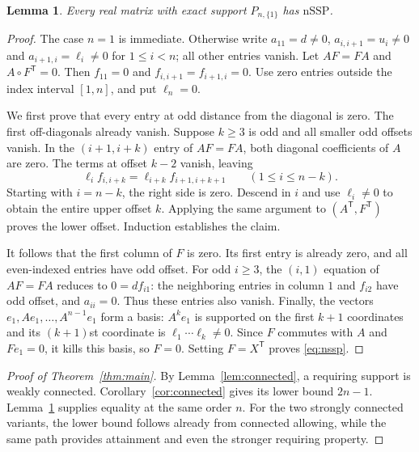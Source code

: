 \documentclass[11pt]{article}
\newtheorem{lemma}[theorem]{Lemma}
\newcommand{\nssp}{\mathrm{nSSP}}
\begin{document}
\begin{lemma}\label{lem:path}
Every real matrix with exact support $P_{n,\{1\}}$ has $\nssp$.
\end{lemma}
\begin{proof}
The case $n=1$ is immediate. Otherwise write
$a_{11}=d\ne0$, $a_{i,i+1}=u_i\ne0$ and
$a_{i+1,i}=\ell_i\ne0$ for $1\leq i<n$; all other entries vanish.
Let $AF=FA$ and $A\circ F^{\mathsf T}=0$. Then
$f_{11}=0$ and $f_{i,i+1}=f_{i+1,i}=0$.
Use zero entries outside the index interval $[1,n]$, and put
$\ell_n=0$.

We first prove that every entry at odd distance from the diagonal is
zero. The first off-diagonals already vanish. Suppose $k\geq3$ is odd
and all smaller odd offsets vanish. In the $(i+1,i+k)$ entry of
$AF=FA$, both diagonal coefficients of $A$ are zero. The terms at
offset $k-2$ vanish, leaving
\begin{equation}\label{eq:odd}
 \ell_i f_{i,i+k}=\ell_{i+k}f_{i+1,i+k+1}
 \qquad(1\leq i\leq n-k).
\end{equation}
Starting with $i=n-k$, the right side is zero. Descend in $i$ and
use $\ell_i\ne0$ to obtain the entire upper offset $k$. Applying the
same argument to $(A^{\mathsf T},F^{\mathsf T})$ proves the lower
offset. Induction establishes the claim.

It follows that the first column of $F$ is zero. Its first entry is
already zero, and all even-indexed entries have odd offset. For odd
$i\geq3$, the $(i,1)$ equation of $AF=FA$ reduces to
$0=d f_{i1}$: the neighboring entries in column $1$ and $f_{i2}$
have odd offset, and $a_{ii}=0$. Thus these entries also vanish.
Finally, the vectors $e_1,Ae_1,\ldots,A^{n-1}e_1$ form a basis:
$A^ke_1$ is supported on the first $k+1$ coordinates and its
$(k+1)$st coordinate is $\ell_1\cdots\ell_k\ne0$.
Since $F$ commutes with $A$ and $Fe_1=0$, it kills this basis, so
$F=0$. Setting $F=X^{\mathsf T}$ proves \eqref{eq:nssp}.
\end{proof}

\begin{proof}[Proof of Theorem~\ref{thm:main}]
By Lemma~\ref{lem:connected}, a requiring support is weakly connected.
Corollary~\ref{cor:connected} gives its lower bound $2n-1$.
Lemma~\ref{lem:path} supplies equality at the same order $n$.
For the two strongly connected variants, the lower bound follows
already from connected allowing, while the same path provides
attainment and even the stronger requiring property.
\end{proof}
\end{document}
